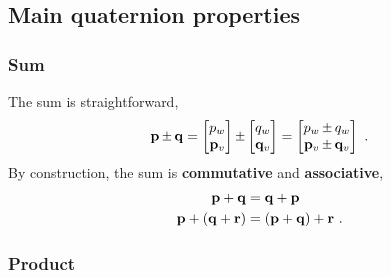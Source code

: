 \subsection{Main quaternion properties}

\subsubsection{Sum}

The sum is straightforward,
%
\begin{align}
\bfp\pm\bfq = \begin{bmatrix}
p_w \\ \pv
\end{bmatrix} \pm \begin{bmatrix}
q_w \\ \qv
\end{bmatrix}
  = \begin{bmatrix}
p_w \pm q_w \\ \pv \pm \qv
\end{bmatrix}~.
\end{align}
%
By construction, the sum is \textbf{commutative} and \textbf{associative},
%
%
\begin{align}
{\bf p}+{\bf q}&={\bf q}+{\bf p} \\
{\bf p}+({\bf q}+{\bf r})&=({\bf p}+{\bf q})+{\bf r}
~.
\end{align}%
%

\subsubsection{Product}

